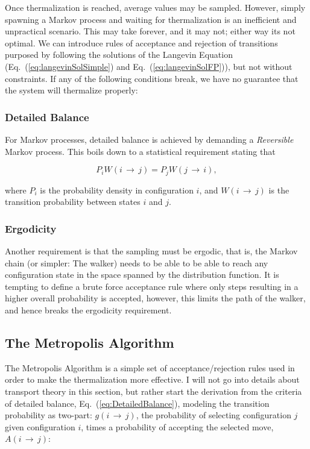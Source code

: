 Once thermalization is reached, average values may be sampled. However, simply spawning a Markov process and waiting for thermalization is an inefficient and unpractical scenario. This may take forever, and it may not; either way its not optimal. We can introduce rules of acceptance and rejection of transitions purposed by following the solutions of the Langevin Equation (Eq.~(\ref{eq:langevinSolSimple}) and Eq.~(\ref{eq:langevinSolFP})), but not without constraints. If any of the following conditions break, we have no guarantee that the system will thermalize properly:

\subsubsection{Detailed Balance} 

For Markov processes, detailed balance is achieved by demanding a \textit{Reversible} Markov process. This boils down to a statistical requirement stating that 

\begin{equation}
 P_iW(i\,\rightarrow\,j) = P_jW(j\,\rightarrow\,i),
 \label{eq:DetailedBalance}
\end{equation}

where $P_i$ is the probability density in configuration $i$, and $W(i\,\rightarrow\,j)$ is the transition probability between states $i$ and $j$. 

\subsubsection{Ergodicity}

Another requirement is that the sampling must be ergodic, that is, the Markov chain (or simpler: The walker) needs to be able to be able to reach any configuration state in the space spanned by the distribution function. It is tempting to define a brute force acceptance rule where only steps resulting in a higher overall probability is accepted, however, this limits the path of the walker, and hence breaks the ergodicity requirement.

\subsection{The Metropolis Algorithm}

The Metropolis Algorithm is a simple set of acceptance/rejection rules used in order to make the thermalization more effective. I will not go into details about transport theory in this section, but rather start the derivation from the criteria of detailed balance, Eq.~(\ref{eq:DetailedBalance}), modeling the transition probability as two-part: $g(i\,\rightarrow\,j)$, the probability of selecting configuration $j$ given configuration $i$, times a probability of accepting the selected move, $A(i\,\rightarrow\,j)$:

